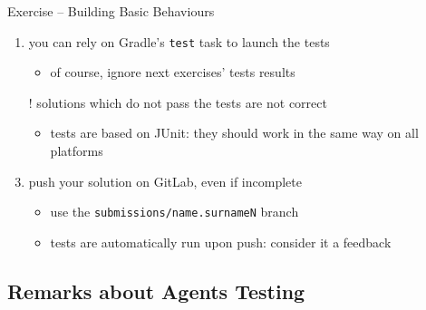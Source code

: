 \documentclass{beamer}\mode<presentation>{\usetheme{AMSCesenaPurpleAndGold}}
\begin{document}
\begin{frame}[c,allowframebreaks]{Exercise \currentExercise{} -- Building Basic Behaviours}
\begin{enumerate}
        \medskip

        \item you can rely on Gradle's \texttt{test} task to launch the tests
        \begin{itemize}
            \item of course, ignore next exercises' tests results
        \end{itemize}

        \medskip

        \item[!] solutions which do not pass the tests are not correct
        \begin{itemize}
            \item tests are based on JUnit: they should work in the same way on all platforms
        \end{itemize}

        \medskip

        \item push your solution on GitLab, \alert{even if incomplete}
        \begin{itemize}
            \item use the \texttt{submissions/\alert{name.surnameN}} branch
            \item tests are automatically run upon push: consider it a feedback
        \end{itemize}

    \end{enumerate}

\end{frame}

\subsection{Remarks about Agents Testing}
\end{document}
